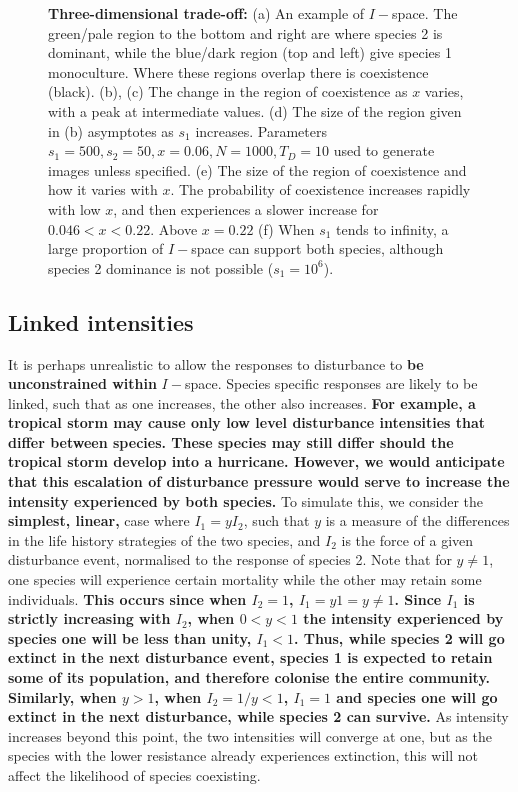 \begin{figure}[htbp]
\begin{tabular}{rrrr}
\end{tabular}
\caption{\textbf{Three-dimensional trade-off:} (a) An example of $I-$space. The green/pale region to the bottom and right are where species 2 is dominant, while the blue/dark region (top and left) give species 1 monoculture. Where these regions overlap there is coexistence (black). (b),  (c) The change in the region of coexistence as $x$ varies, with a peak at intermediate values. (d) The size of the region given in (b) asymptotes as $s_1$ increases. Parameters $s_1=500,s_2=50,x=0.06,N=1000,T_D=10$ used to generate images unless specified. (e) The size of the region of coexistence and how it varies with $x$. The probability of coexistence increases rapidly with low $x$, and then experiences a slower increase for $0.046<x<0.22$. Above $x=0.22$ (f) When $s_1$ tends to infinity, a large proportion of $I-$space can support both species, although species 2 dominance is not possible ($s_1=10^6$).}
\label{full}
\end{figure}

\subsection{Linked intensities}
It is perhaps unrealistic to allow the responses to disturbance to \textbf{ be unconstrained within} $I-$space. Species specific responses are likely to be linked, such that as one increases, the other also increases. \textbf{For example, a tropical storm may cause only low level disturbance intensities that differ between species. These species may still differ should the tropical storm develop into a hurricane. However, we would anticipate that this escalation of disturbance pressure would serve to increase the intensity experienced by both species.} To simulate this, we consider the \textbf{simplest, linear,} case where $I_1=yI_2$, such that $y$ is a measure of the differences in the life history strategies of the two species, and $I_2$ is the force of a given disturbance event, normalised to the response of species 2. Note that for $y\neq 1$, one species will experience certain mortality while the other may retain some individuals.\textbf{ This occurs since when $I_2=1$, $I_1=y1=y\neq1$. Since $I_1$ is strictly increasing with $I_2$, when $0<y<1$ the intensity experienced by species one will be less than unity, $I_1<1$. Thus, while species 2 will go extinct in the next disturbance event, species 1 is expected to retain some of its population, and therefore colonise the entire community. Similarly, when $y>1$, when $I_2=1/y <1$, $I_1=1$ and species one will go extinct in the next disturbance, while species 2 can survive.} As intensity increases beyond this point, the two intensities will converge at one, but as the species with the lower resistance already experiences extinction, this will not affect the likelihood of species coexisting.


